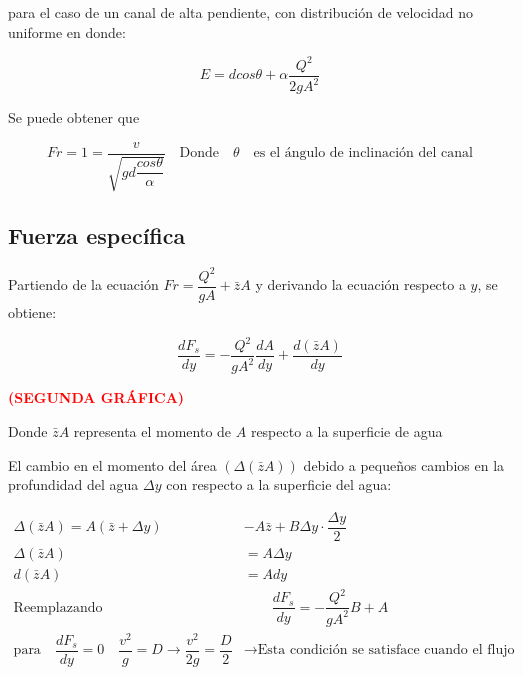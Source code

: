 \documentclass[a4paper, 11pt]{article}
\begin{document}
para el caso de un canal de alta pendiente, con distribución de velocidad no uniforme en donde:

\begin{equation}
    E=dcos\theta+\alpha	\dfrac{Q^{2}}{2gA^{2}}
\end{equation}

Se puede obtener que

\begin{equation}
    Fr=1=\dfrac{v}{\sqrt{gd\dfrac{cos\theta}{\alpha}}} \quad \text{Donde} \quad \theta \quad \text{es el ángulo de inclinación del canal}
\end{equation}


\subsection{Fuerza específica}

Partiendo de la ecuación $Fr=\dfrac{Q^{2}}{gA}+\bar{z}A$ y derivando la ecuación respecto a $y$, se obtiene:

\begin{equation}
    \dfrac{dF_{s}}{dy}=-\dfrac{Q^{2}}{gA^{2}}\dfrac{dA}{dy}+\dfrac{d(\bar{z}A)}{dy}
\end{equation}

\textcolor{red}{\textbf{(SEGUNDA GRÁFICA)}} \vspace{1ex}


Donde $\bar{z}A$ representa el momento de $A$ respecto a la superficie de agua

El cambio en el  momento del área $(\Delta(\bar{z}A))$ debido a pequeños cambios en la profundidad del agua $\Delta y$ con respecto a la superficie del agua:

\begin{equation}
    \begin{aligned}
        \Delta(\bar{z}A)=A(\bar{z}+\Delta y)&-A\bar{z}+B\Delta y \cdot \dfrac{\Delta y}{2}\\ 
        \Delta(\bar{z}A)&=A \Delta y\\
        d(\bar{z}A)&=Ady\\
        \text{Reemplazando}& \qquad \dfrac{dF_{s}}{dy}=-\dfrac{Q^{2}}{gA^{2}}B+A\\
        \text{para} \quad \dfrac{dF_{s}}{dy}=0 \quad \dfrac{v^{2}}{g}=D \rightarrow \dfrac{v^{2}}{2g}=\dfrac{D}{2} &\rightarrow \text{Esta condición se satisface cuando el flujo es crítico}
    \end{aligned} 
\end{equation}
\end{document}
